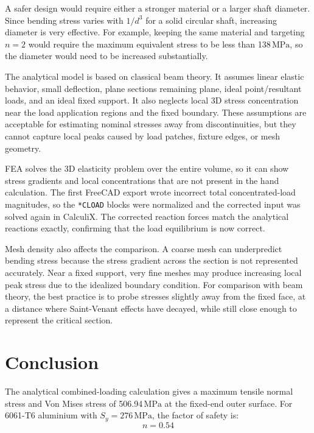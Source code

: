 \documentclass[12pt,a4paper]{article}
\newcommand{\SI}[2]{#1\,\ensuremath{\mathrm{#2}}}
\begin{document}
A safer design would require either a stronger material or a larger shaft diameter. Since bending stress varies with \(1/d^3\) for a solid circular shaft, increasing diameter is very effective. For example, keeping the same material and targeting \(n=2\) would require the maximum equivalent stress to be less than \SI{138}{MPa}, so the diameter would need to be increased substantially.

The analytical model is based on classical beam theory. It assumes linear elastic behavior, small deflection, plane sections remaining plane, ideal point/resultant loads, and an ideal fixed support. It also neglects local 3D stress concentration near the load application regions and the fixed boundary. These assumptions are acceptable for estimating nominal stresses away from discontinuities, but they cannot capture local peaks caused by load patches, fixture edges, or mesh geometry.

FEA solves the 3D elasticity problem over the entire volume, so it can show stress gradients and local concentrations that are not present in the hand calculation. The first FreeCAD export wrote incorrect total concentrated-load magnitudes, so the \texttt{*CLOAD} blocks were normalized and the corrected input was solved again in CalculiX. The corrected reaction forces match the analytical reactions exactly, confirming that the load equilibrium is now correct.

Mesh density also affects the comparison. A coarse mesh can underpredict bending stress because the stress gradient across the section is not represented accurately. Near a fixed support, very fine meshes may produce increasing local peak stress due to the idealized boundary condition. For comparison with beam theory, the best practice is to probe stresses slightly away from the fixed face, at a distance where Saint-Venant effects have decayed, while still close enough to represent the critical section.

\section{Conclusion}

The analytical combined-loading calculation gives a maximum tensile normal stress and Von Mises stress of \SI{506.94}{MPa} at the fixed-end outer surface. For 6061-T6 aluminium with \(S_y=\SI{276}{MPa}\), the factor of safety is:
\begin{equation}
n=0.54
\end{equation}
\end{document}
